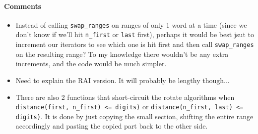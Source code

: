 \documentclass[letterpaper, 8pt]{article}
\begin{document}
\paragraph{Comments}
\begin{itemize}
    \item Instead of calling \texttt{swap\_ranges} on ranges of only 1 word at
        a time (since we don't know if we'll hit \texttt{n\_first} or 
        \texttt{last} first), perhaps it would be best jsut to increment our 
        iterators to see which one is hit first and then call 
        \texttt{swap\_ranges} on the resulting range? To my knowledge there 
        wouldn't be any extra increments, and the code would be much simpler.

    \item Need to explain the RAI version. It will probably be lengthy though... 
    \item There are also 2 functions that short-circuit the rotate algorithms
        when \texttt{distance(first, n\_first) <= digits)} or 
        \texttt{distance(n\_first, last) <= digits)}. It is done by just copying
        the small section, shifting the entire range accordingly and pasting 
        the copied part back to the other side.
\end{itemize}



\end{document}
